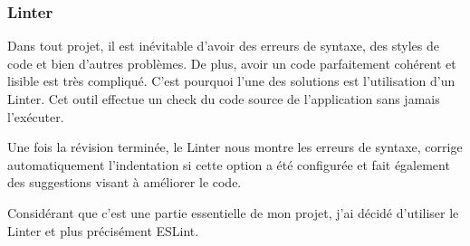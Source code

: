 \subsubsection{Linter}
Dans tout projet, il est inévitable d'avoir des erreurs de syntaxe, des styles de code et bien d'autres problèmes. De plus, avoir un code parfaitement cohérent et lisible est très compliqué. C'est pourquoi l'une des solutions est l'utilisation d'un Linter. Cet outil effectue un check du code source de l'application sans jamais l'exécuter.

Une fois la révision terminée, le Linter nous montre les erreurs de syntaxe, corrige automatiquement l'indentation si cette option a été configurée et fait également des suggestions visant à améliorer le code.

Considérant que c'est une partie essentielle de mon projet, j'ai décidé d'utiliser le Linter et plus précisément ESLint.

